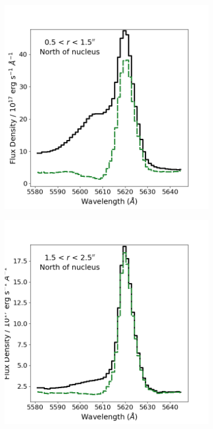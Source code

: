 \begin{figure}[!t]
    \begin{subfigure}[]{0.51\linewidth}
        \includegraphics[width=\linewidth, trim={0 1.8cm 0 0}, clip]{figures/muse_f13451_1232/broadsub_apertures/ap1_original_broadsub_comparison.png}
    \end{subfigure}
    \hfill
    \begin{subfigure}[]{0.48\linewidth}
        \includegraphics[width=\linewidth, trim={1.1cm 1.8cm 0 0}, clip]{figures/muse_f13451_1232/broadsub_apertures/ap2_original_broadsub_comparison.png}

\end{subfigure}
\end{figure}
